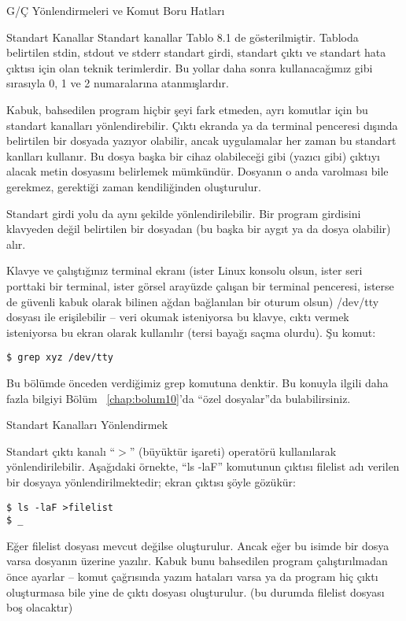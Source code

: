 \begin{section}{G/Ç Yönlendirmeleri ve Komut Boru Hatları}
\begin{subsection}{Standart Kanallar}
Standart kanallar Tablo 8.1 de gösterilmiştir. Tabloda belirtilen stdin, stdout ve stderr standart girdi, standart çıktı ve standart hata çıktısı için olan teknik terimlerdir. Bu yollar daha sonra kullanacağımız gibi sırasıyla 0, 1 ve 2 numaralarına atanmışlardır.

Kabuk, bahsedilen program hiçbir şeyi fark etmeden, ayrı komutlar için bu standart kanalları yönlendirebilir. Çıktı ekranda ya da terminal penceresi dışında belirtilen bir dosyada yazıyor olabilir, ancak uygulamalar her zaman bu standart kanlları kullanır. Bu dosya başka bir cihaz olabileceği gibi (yazıcı gibi) çıktıyı alacak metin dosyasını belirlemek mümkündür. Dosyanın o anda varolması bile gerekmez, gerektiği zaman kendiliğinden oluşturulur.

Standart girdi yolu da aynı şekilde yönlendirilebilir. Bir program girdisini klavyeden değil belirtilen bir dosyadan (bu başka bir aygıt ya da dosya olabilir) alır.

\footnotesize
Klavye ve çalıştığınız terminal ekranı (ister Linux konsolu olsun, ister seri porttaki bir terminal, ister görsel arayüzde çalışan bir terminal penceresi, isterse de güvenli kabuk olarak bilinen ağdan bağlanılan bir oturum olsun) /dev/tty dosyası ile erişilebilir – veri okumak isteniyorsa bu klavye, cıktı vermek isteniyorsa bu ekran olarak kullanılır (tersi bayağı saçma olurdu). Şu komut:

\begin{verbatim}
$ grep xyz /dev/tty
\end{verbatim}
\normalsize

Bu bölümde önceden verdiğimiz grep komutuna denktir. Bu konuyla ilgili daha fazla bilgiyi Bölüm ~\ref{chap:bolum10}'da “özel dosyalar”da bulabilirsiniz.
\end{subsection}
\begin{subsection}{Standart Kanalları Yönlendirmek}

Standart çıktı kanalı “$>$” (büyüktür işareti) operatörü kullanılarak yönlendirilebilir. Aşağıdaki örnekte, “ls -laF” komutunun çıktısı filelist adı verilen bir  dosyaya yönlendirilmektedir; ekran çıktısı şöyle gözükür:

\footnotesize
\begin{verbatim}
$ ls -laF >filelist 
$ _
\end{verbatim}
\normalsize

Eğer filelist dosyası mevcut değilse oluşturulur. Ancak eğer bu isimde bir dosya varsa dosyanın üzerine yazılır. Kabuk bunu bahsedilen program çalıştırılmadan önce ayarlar – komut çağrısında yazım hataları varsa ya da program hiç çıktı oluşturmasa bile yine de çıktı dosyası oluşturulur. (bu durumda filelist dosyası boş olacaktır)


\end{subsection}
\end{section}
